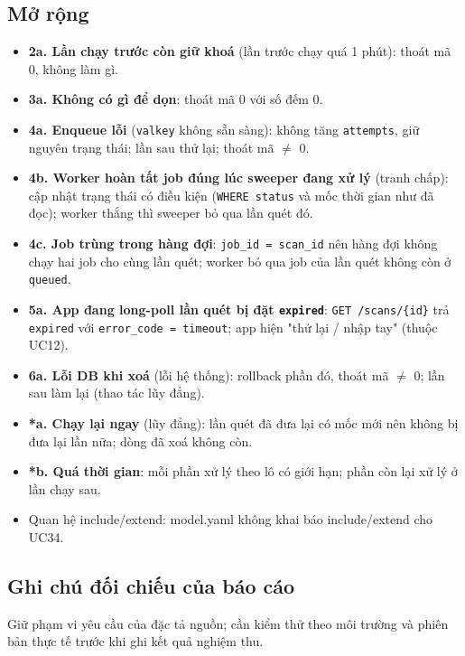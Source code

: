 \subsection{Mở rộng}
\begin{itemize}
\item \textbf{2a. Lần chạy trước còn giữ khoá} (lần trước chạy quá 1 phút): thoát mã 0, không làm gì.
\item \textbf{3a. Không có gì để dọn}: thoát mã 0 với số đếm 0.
\item \textbf{4a. Enqueue lỗi} ({\small\texttt{valkey}} không sẵn sàng): không tăng {\small\texttt{attempts}}, giữ nguyên trạng thái; lần sau thử lại; thoát mã \ensuremath{\neq} 0.
\item \textbf{4b. Worker hoàn tất job đúng lúc sweeper đang xử lý} (tranh chấp): cập nhật trạng thái có điều kiện ({\small\texttt{WHERE status}} và mốc thời gian như đã đọc); worker thắng thì sweeper bỏ qua lần quét đó.
\item \textbf{4c. Job trùng trong hàng đợi}: {\small\texttt{job\_\allowbreak{}\allowbreak{}id = scan\_\allowbreak{}\allowbreak{}id}} nên hàng đợi không chạy hai job cho cùng lần quét; worker bỏ qua job của lần quét không còn ở {\small\texttt{queued}}.
\item \textbf{5a. App đang long-\allowbreak{}poll lần quét bị đặt {\small\texttt{expired}}}: {\small\texttt{GET /\allowbreak{}\allowbreak{}scans/\allowbreak{}\allowbreak{}\{id\}}} trả {\small\texttt{expired}} với {\small\texttt{error\_\allowbreak{}\allowbreak{}code = timeout}}; app hiện "thử lại /\allowbreak{} nhập tay" (thuộc UC12).
\item \textbf{6a. Lỗi DB khi xoá} (lỗi hệ thống): rollback phần đó, thoát mã \ensuremath{\neq} 0; lần sau làm lại (thao tác lũy đẳng).
\item \textbf{*a. Chạy lại ngay} (lũy đẳng): lần quét đã đưa lại có mốc mới nên không bị đưa lại lần nữa; dòng đã xoá không còn.
\item \textbf{*b. Quá thời gian}: mỗi phần xử lý theo lô có giới hạn; phần còn lại xử lý ở lần chạy sau.
\item Quan hệ include/\allowbreak{}extend: model.yaml không khai báo include/\allowbreak{}extend cho UC34.
\end{itemize}
\subsection{Ghi chú đối chiếu của báo cáo}
Giữ phạm vi yêu cầu của đặc tả nguồn; cần kiểm thử theo môi trường và phiên bản thực tế trước khi ghi kết quả nghiệm thu.

